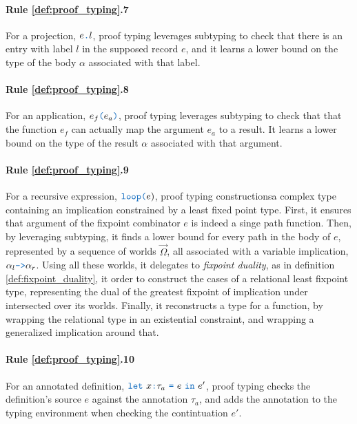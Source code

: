 \documentclass[acmsmall]{acmart}
\theoremstyle{definition}
\begin{document}
\paragraph{Rule \ref{def:proof_typing}.7}
For a projection, $e\obj{.}l$, proof typing
leverages subtyping to check that there is an entry with label $l$ 
in the supposed record $e$, and it learns a lower bound 
on the type of the body $\alpha$ associated with that label.


\paragraph{Rule \ref{def:proof_typing}.8}
For an application, $e_f\obj{(}e_a\obj{)}$, proof typing
leverages subtyping to check that that the function $e_f$ can actually
map the argument $e_a$ to a result. It learns a lower bound 
on the type of the result $\alpha$ associated with that argument.


\paragraph{Rule \ref{def:proof_typing}.9}
For a recursive expression, $\obj{loop(}e{)}$, proof typing
constructionsa complex type containing an implication constrained
by a least fixed point type.  
First, it ensures that argument of the fixpoint combinator $e$ is indeed a 
singe path function. Then, by leveraging subtyping, 
it finds a lower bound for every path in the body of $e$,
represented by a sequence of worlds $\vec{\Omega}$, 
all associated with a variable implication, $\alpha_l\obj{->}\alpha_r$.
Using all these worlds, it delegates to \emph{fixpoint duality}, as in definition \ref{def:fixpoint_duality},
it order to construct the cases of a relational least fixpoint type, 
representing the dual of the greatest fixpoint of implication under intersected over its worlds.
Finally, it reconstructs a type for a function, by wrapping the relational type in an existential constraint,
and wrapping a generalized implication around that. 

\paragraph{Rule \ref{def:proof_typing}.10}
For an annotated definition, $\obj{let}\ x \obj{:} \tau_a\ \obj{=}\ e\ \obj{in}\ e'$, 
proof typing checks the definition's source $e$ against the annotation $\tau_a$,
and adds the annotation to the typing environment when checking the contintuation $e'$.
\end{document}
